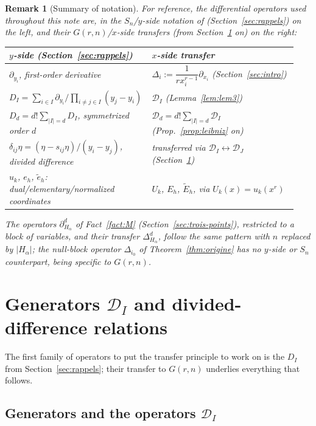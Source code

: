 \documentclass[10pt,a4paper]{amsart}
\newtheorem{remark}[theorem]{Remark}
\begin{document}
\begin{remark}[Summary of notation]\label{rem:notation}
For reference, the differential operators used throughout this note are, in the $S_n$/$y$-side notation of \cite{Ze} (Section~\ref{sec:rappels}) on the left, and their $G(r,n)$/$x$-side transfers (from Section~\ref{sec:generators} on) on the right:
\begin{center}
\small
\begin{tabular}{@{}p{0.44\linewidth}p{0.5\linewidth}@{}}
$y$-side (Section~\ref{sec:rappels}) & $x$-side transfer \\ \hline
$\partial_{y_i}$, first-order derivative & $\Delta_i:=\dfrac{1}{rx_i^{r-1}}\partial_{x_i}$ (Section~\ref{sec:intro}) \\[2pt]
$D_I=\sum_{i\in I}\partial_{y_i}/\prod_{i\ne j\in I}(y_j-y_i)$ & $\mathcal D_I$ (Lemma~\ref{lem:lem3}) \\[2pt]
$D_d=d!\sum_{|I|=d}D_I$, symmetrized order $d$ & $\mathcal D_d=d!\sum_{|I|=d}\mathcal D_I$ (Prop.~\ref{prop:leibniz} on) \\[2pt]
$\delta_{ij}\eta=(\eta-s_{ij}\eta)/(y_i-y_j)$, divided difference & transferred via $\mathcal D_I\leftrightarrow\mathcal D_J$ (Section~\ref{sec:generators}) \\[2pt]
$u_k$, $e_h$, $\widetilde e_h$: dual/elementary/normalized coordinates & $U_k$, $E_h$, $\widetilde E_h$, via $U_k(x)=u_k(x^r)$
\end{tabular}
\end{center}
The operators $\partial_{H_\alpha}^d$ of Fact~\ref{fact:M} (Section~\ref{sec:trois-points}), restricted to a block of variables, and their transfer $\Delta_{H_\alpha}^d$, follow the same pattern with $n$ replaced by $|H_\alpha|$; the null-block operator $\Delta_{i_0}$ of Theorem~\ref{thm:origine} has no $y$-side or $S_n$ counterpart, being specific to $G(r,n)$.
\end{remark}

\section{Generators \texorpdfstring{$\mathcal D_I$}{DI} and divided-difference relations}\label{sec:generators}

The first family of operators to put the transfer principle to work on is the $D_I$ from Section~\ref{sec:rappels}; their transfer to $G(r,n)$ underlies everything that follows.

\subsection{Generators and the operators \texorpdfstring{$\mathcal D_I$}{DI}}
\end{document}
